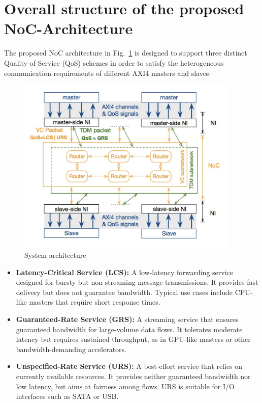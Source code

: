 \section{Overall structure of the proposed NoC-Architecture}

The proposed NoC architecture in Fig.~\ref{fig:System_Architecture} is designed to support three distinct Quality-of-Service (QoS) schemes in order to satisfy the heterogeneous communication requirements of different AXI4 masters and slaves:

\begin{figure}[htbp]
    \centering
    \includegraphics[width=0.95\textwidth]{img/System Architecture.png}
    \caption{System architecture}
    \label{fig:System_Architecture}
\end{figure}

\begin{itemize}
    \item \textbf{Latency-Critical Service (LCS):}\label{LCS} A low-latency forwarding service designed for bursty but non-streaming message transmissions. It provides fast delivery but does not guarantee bandwidth. Typical use cases include CPU-like masters that require short response times.
    \item \textbf{Guaranteed-Rate Service (GRS):}\label{GRS} A streaming service that ensures guaranteed bandwidth for large-volume data flows. It tolerates moderate latency but requires sustained throughput, as in GPU-like masters or other bandwidth-demanding accelerators.
    \item \textbf{Unspecified-Rate Service (URS):}\label{URS} A best-effort service that relies on currently available resources. It provides neither guaranteed bandwidth nor low latency, but aims at fairness among flows. URS is suitable for I/O interfaces such as SATA or USB.
\end{itemize}

